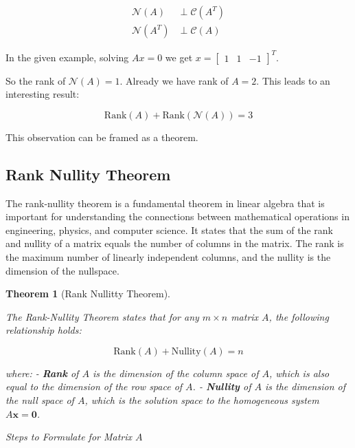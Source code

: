 \documentclass[
  letterpaper,
  DIV=11,
  numbers=noendperiod]{scrreprt}
\theoremstyle{plain}
\newtheorem{theorem}{Theorem}[chapter]
\theoremstyle{definition}
\theoremstyle{remark}
\begin{document}
\begin{tcolorbox}
\begin{tcolorbox}
\begin{align*}
\mathcal{N}(A)&\perp \mathcal{C}(A^T)\\
\mathcal{N}(A^T)&\perp \mathcal{C}(A)
\end{align*}

\end{tcolorbox}

In the given example, solving \(Ax=0\) we get
\(x=\begin{bmatrix}1&1&-1\end{bmatrix}^T\).

So the rank of \(\mathcal{N}(A)=1\). Already we have rank of \(A=2\).
This leads to an interesting result:

\[\text{Rank}(A)+\text{Rank}(\mathcal{N}(A))=3\]

This observation can be framed as a theorem.

\subsection{Rank Nullity Theorem}\label{rank-nullity-theorem}

The rank-nullity theorem is a fundamental theorem in linear algebra that
is important for understanding the connections between mathematical
operations in engineering, physics, and computer science. It states that
the sum of the rank and nullity of a matrix equals the number of columns
in the matrix. The rank is the maximum number of linearly independent
columns, and the nullity is the dimension of the nullspace.

\begin{theorem}[Rank Nullitty
Theorem]\protect\hypertarget{thm-RNT}{}\label{thm-RNT}

The Rank-Nullity Theorem states that for any \(m \times n\) matrix
\(A\), the following relationship holds:

\[
\text{Rank}(A) + \text{Nullity}(A) = n
\]

where: - \textbf{Rank} of \(A\) is the dimension of the column space of
\(A\), which is also equal to the dimension of the row space of \(A\). -
\textbf{Nullity} of \(A\) is the dimension of the null space of \(A\),
which is the solution space to the homogeneous system
\(A \mathbf{x} = \mathbf{0}\).

\end{theorem}

\emph{Steps to Formulate for Matrix \(A\)}


\end{tcolorbox}
\end{document}
